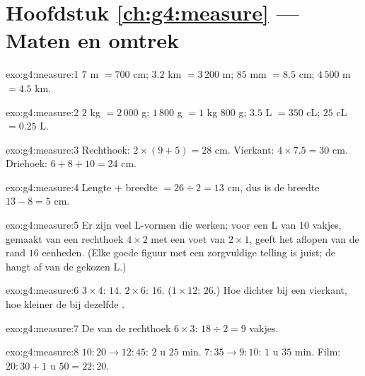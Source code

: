 \section*{Hoofdstuk \ref{ch:g4:measure} --- Maten en omtrek}

\begin{solution}{exo:g4:measure:1}
$7$ m $= 700$ cm; \quad $3.2$ km $= 3\,200$ m; \quad
$85$ mm $= 8.5$ cm; \quad $4\,500$ m $= 4.5$ km.
\end{solution}

\begin{solution}{exo:g4:measure:2}
$2$ kg $= 2\,000$ g; \quad $1\,800$ g $= 1$ kg $800$ g; \quad
$3.5$ L $= 350$ cL; \quad $25$ cL $= 0.25$ L.
\end{solution}

\begin{solution}{exo:g4:measure:3}
Rechthoek: $2 \times (9 + 5) = 28$ cm. Vierkant: $4 \times 7.5 = 30$ cm.
Driehoek: $6 + 8 + 10 = 24$ cm.
\end{solution}

\begin{solution}{exo:g4:measure:4}
Lengte $+$ breedte $= 26 \div 2 = 13$ cm, dus is de breedte
$13 - 8 = 5$ cm.
\end{solution}

\begin{solution}{exo:g4:measure:5}
Er zijn veel L-vormen die werken; voor een L van $10$ vakjes, gemaakt van een
rechthoek $4 \times 2$ met een voet van $2 \times 1$, geeft het aflopen van de
rand $16$ eenheden. (Elke goede figuur met een zorgvuldige telling is juist;
de  hangt af van de gekozen L.)
\end{solution}

\begin{solution}{exo:g4:measure:6}
$3 \times 4$:  $14$. $2 \times 6$:  $16$. ($1 \times 12$: 
$26$.) Hoe dichter bij een vierkant, hoe kleiner de  bij dezelfde
.
\end{solution}

\begin{solution}{exo:g4:measure:7}
De  van de rechthoek $6 \times 3$: $18 \div 2 = 9$ vakjes.
\end{solution}

\begin{solution}{exo:g4:measure:8}
$10{:}20 \to 12{:}45$: $2$ u $25$ min. $7{:}35 \to 9{:}10$: $1$ u $35$ min.
Film: $20{:}30 + 1$ u $50 = 22{:}20$.
\end{solution}

